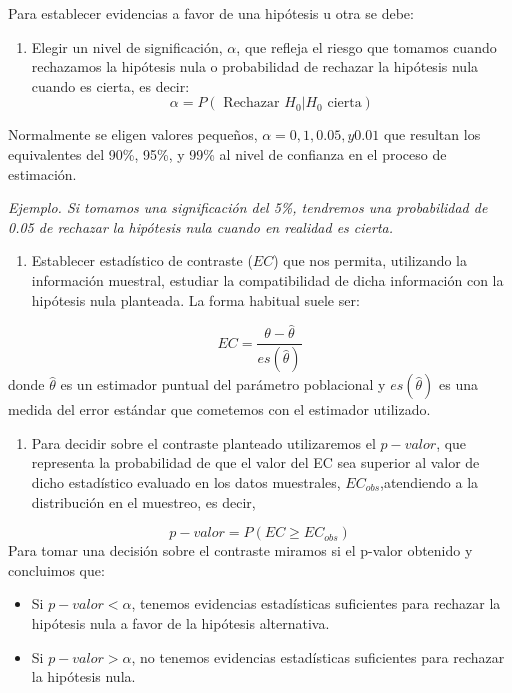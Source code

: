\documentclass[
]{book}
\providecommand{\tightlist}{%
  \setlength{\itemsep}{0pt}\setlength{\parskip}{0pt}}
\begin{document}
Para establecer evidencias a favor de una hipótesis u otra se debe:

\begin{enumerate}
\def\labelenumi{\arabic{enumi}.}
\tightlist
\item
  Elegir un nivel de significación, \(\alpha\), que refleja el riesgo que tomamos cuando rechazamos la hipótesis nula o probabilidad de rechazar la hipótesis nula cuando es cierta, es decir: \[\alpha = P(\text{ Rechazar } H_0 | H_0 \text{ cierta})\]
\end{enumerate}

Normalmente se eligen valores pequeños, \(\alpha=0,1, 0.05, y 0.01\) que resultan los equivalentes del 90\%, 95\%, y 99\% al nivel de confianza en el proceso de estimación.

\emph{Ejemplo. Si tomamos una significación del 5\%, tendremos una probabilidad de 0.05 de rechazar la hipótesis nula cuando en realidad es cierta.}

\begin{enumerate}
\def\labelenumi{\arabic{enumi}.}
\setcounter{enumi}{1}
\tightlist
\item
  Establecer estadístico de contraste (\(EC\)) que nos permita, utilizando la información muestral, estudiar la compatibilidad de dicha información con la hipótesis nula planteada. La forma habitual suele ser:
\end{enumerate}

\[EC = \frac{\theta - \hat{\theta}}{es(\hat{\theta})}\] donde \(\hat{\theta}\) es un estimador puntual del parámetro poblacional y \(es(\hat{\theta})\) es una medida del error estándar que cometemos con el estimador utilizado.

\begin{enumerate}
\def\labelenumi{\arabic{enumi}.}
\setcounter{enumi}{2}
\tightlist
\item
  Para decidir sobre el contraste planteado utilizaremos el \(p-valor\), que representa la probabilidad de que el valor del EC sea superior al valor de dicho estadístico evaluado en los datos muestrales, \(EC_{obs}\),atendiendo a la distribución en el muestreo, es decir,
\end{enumerate}

\[p-valor = P(EC \geq EC_{obs})\] Para tomar una decisión sobre el contraste miramos si el p-valor obtenido y concluimos que:

\begin{itemize}
\tightlist
\item
  Si \(p-valor < \alpha\), tenemos evidencias estadísticas suficientes para rechazar la hipótesis nula a favor de la hipótesis alternativa.
\item
  Si \(p-valor > \alpha\), no tenemos evidencias estadísticas suficientes para rechazar la hipótesis nula.
\end{itemize}
\end{document}
